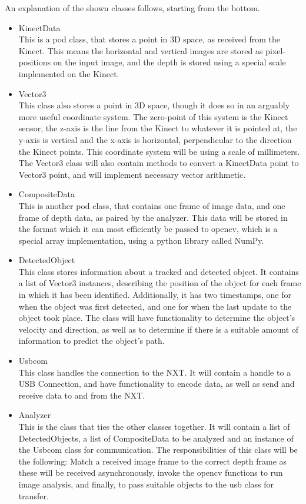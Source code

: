 An explanation of the shown classes follows, starting from the bottom.
\begin{itemize}
  \item{KinectData}\\
  This is a \ac{pod} class, that stores a point in 3D space, as received from the Kinect. This means the horizontal
  and vertical images are stored as pixel-positions on the input image, and the depth is stored using a special scale
  implemented on the Kinect.
  \item{Vector3}\\
  This class also stores a point in 3D space, though it does so in an arguably more useful coordinate system. 
  The zero-point of this system is the Kinect sensor, the z-axis is the line from the Kinect to whatever it is pointed
  at, the y-axis is vertical and the x-axis is horizontal, perpendicular to the direction the Kinect points.
  This coordinate system will be using a scale of millimeters. The Vector3 class will also contain methods to
  convert a KinectData point to Vector3 point, and will implement necessary vector arithmetic.
  \\
  \item{CompositeData}\\
  This is another \ac{pod} class, that contains one frame of image data, and one frame of depth data,
  as paired by the analyzer. This data will be stored in the format which it can most efficiently be passed
  to \ac{opencv}, which is a special array implementation, using a python library called NumPy\cite{numpy}.
  \item{DetectedObject}\\
  This class stores information about a tracked and detected object. It contains a list of Vector3 instances,
  describing the position of the object for each frame in which it has been identified. Additionally, it has two
  timestamps, one for when the object was first detected, and one for when the last update to the object took place.
  The class will have functionality to determine the object's velocity and direction, as well as to determine if there
  is a suitable amount of information to predict the object's path.
  \\
  \item{Usbcom}\\
  This class handles the connection to the NXT. It will contain a handle to a USB Connection, and have functionality
  to encode data, as well as send and receive data to and from the NXT.
  \\
  \item{Analyzer}\\
  This is the class that ties the other classes together. It will contain a list of DetectedObjects,
  a list of CompositeData to be analyzed and an instance of the Usbcom class for communication.
  The responsibilities of this class will be the following: Match a received
  image frame to the correct depth frame as these will be received asynchronously, invoke the \ac{opencv} functions
  to run image analysis, and finally, to pass suitable objects to the usb class for transfer.
\end{itemize}

